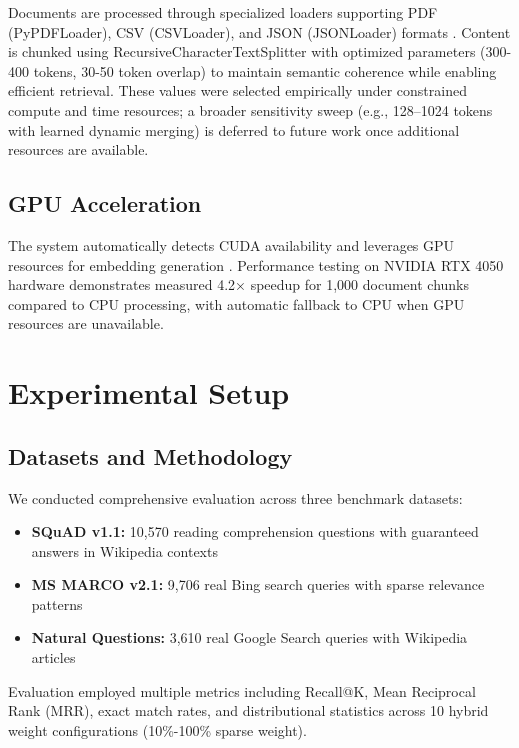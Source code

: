 \documentclass[11pt]{article}
\begin{document}
Documents are processed through specialized loaders supporting PDF (PyPDFLoader), CSV (CSVLoader), and JSON (JSONLoader) formats \cite{langchainjs}. Content is chunked using RecursiveCharacterTextSplitter with optimized parameters (300-400 tokens, 30-50 token overlap) to maintain semantic coherence while enabling efficient retrieval. These values were selected empirically under constrained compute and time resources; a broader sensitivity sweep (e.g., 128--1024 tokens with learned dynamic merging) is deferred to future work once additional resources are available.

\subsection{GPU Acceleration}

The system automatically detects CUDA availability and leverages GPU resources for embedding generation \cite{pytorchcuda}. Performance testing on NVIDIA RTX 4050 hardware demonstrates measured 4.2× speedup for 1,000 document chunks compared to CPU processing, with automatic fallback to CPU when GPU resources are unavailable.

\section{Experimental Setup}

\subsection{Datasets and Methodology}

We conducted comprehensive evaluation across three benchmark datasets:

\begin{itemize}
\item \textbf{SQuAD v1.1:} 10,570 reading comprehension questions with guaranteed answers in Wikipedia contexts \cite{squad}
\item \textbf{MS MARCO v2.1:} 9,706 real Bing search queries with sparse relevance patterns \cite{msmarco}
\item \textbf{Natural Questions:} 3,610 real Google Search queries with Wikipedia articles \cite{naturalquestions}
\end{itemize}

Evaluation employed multiple metrics including Recall@K, Mean Reciprocal Rank (MRR), exact match rates, and distributional statistics across 10 hybrid weight configurations (10\%-100\% sparse weight).
\end{document}
